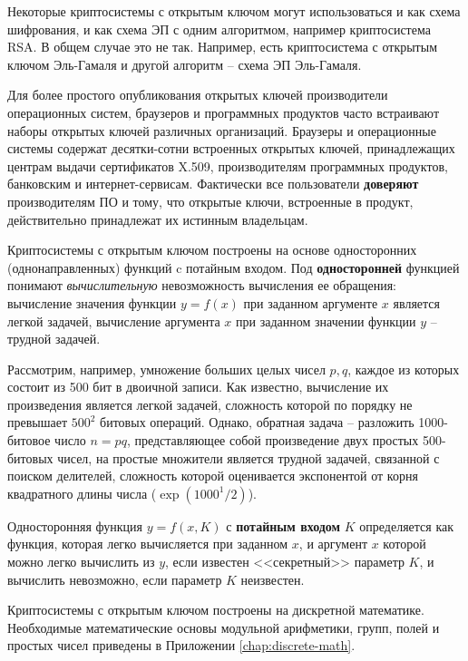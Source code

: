 \documentclass[10pt,a4paper]{book}
\begin{document}
Некоторые криптосистемы с открытым ключом могут использоваться и как схема шифрования, и как схема ЭП с одним алгоритмом, например криптосистема RSA. В общем случае это не так. Например, есть криптосистема с открытым ключом Эль-Гамаля и другой алгоритм -- схема ЭП Эль-Гамаля.

Для более простого опубликования открытых ключей производители операционных систем, браузеров и программных продуктов часто встраивают наборы открытых ключей различных организаций. Браузеры и операционные системы содержат десятки-сотни встроенных открытых ключей, принадлежащих центрам выдачи сертификатов X.509, производителям программных продуктов, банковским и интернет-сервисам. Фактически все пользователи \textbf{доверяют} производителям ПО и тому, что открытые ключи, встроенные в продукт, действительно принадлежат их истинным владельцам.

Криптосистемы с открытым ключом построены на основе односторонних (однонаправленных) функций c потайным входом. Под \textbf{односторонней} функцией понимают \emph{вычислительную} невозможность вычисления ее обращения: вычисление значения функции $y = f(x)$ при заданном аргументе $x$ является легкой задачей, вычисление аргумента $x$ при заданном значении функции $y$ -- трудной задачей.

Рассмотрим, например, умножение больших целых чисел $p,q$, каждое из которых состоит из 500 бит в двоичной записи. Как известно, вычисление их произведения является легкой задачей, сложность которой по порядку не превышает $500^2$ битовых операций. Однако, обратная задача -- разложить 1000-битовое число $n=pq$, представляющее собой произведение двух простых 500-битовых чисел, на простые множители является трудной задачей, связанной с поиском делителей, сложность которой оценивается экспонентой от корня квадратного длины числа ($ \exp(1000^1/2)$).

Односторонняя функция $y = f(x,K)$ с \textbf{потайным входом} $K$ определяется как функция, которая легко вычисляется при заданном $x$, и аргумент $x$ которой можно легко вычислить из $y$, если известен <<секретный>> параметр $K$, и вычислить невозможно, если параметр $K$ неизвестен.

Криптосистемы с открытым ключом построены на дискретной математике. Необходимые математические основы модульной арифметики, групп, полей и простых чисел приведены в Приложении \ref{chap:discrete-math}.
\end{document}
